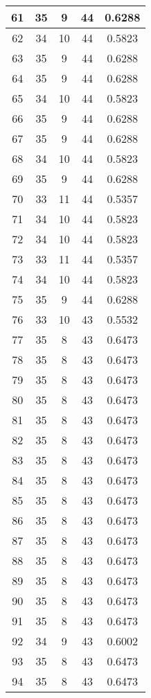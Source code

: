 \documentclass[letterpaper, 12pt]{article}
\begin{document}
\begin{longtable}{|c|c|c|c|c|}
\hline
61 & 35 & 9 & 44 & 0.6288 \\
\hline
62 & 34 & 10 & 44 & 0.5823 \\
\hline
63 & 35 & 9 & 44 & 0.6288 \\
\hline
64 & 35 & 9 & 44 & 0.6288 \\
\hline
65 & 34 & 10 & 44 & 0.5823 \\
\hline
66 & 35 & 9 & 44 & 0.6288 \\
\hline
67 & 35 & 9 & 44 & 0.6288 \\
\hline
68 & 34 & 10 & 44 & 0.5823 \\
\hline
69 & 35 & 9 & 44 & 0.6288 \\
\hline
70 & 33 & 11 & 44 & 0.5357 \\
\hline
71 & 34 & 10 & 44 & 0.5823 \\
\hline
72 & 34 & 10 & 44 & 0.5823 \\
\hline
73 & 33 & 11 & 44 & 0.5357 \\
\hline
74 & 34 & 10 & 44 & 0.5823 \\
\hline
75 & 35 & 9 & 44 & 0.6288 \\
\hline
76 & 33 & 10 & 43 & 0.5532 \\
\hline
77 & 35 & 8 & 43 & 0.6473 \\
\hline
78 & 35 & 8 & 43 & 0.6473 \\
\hline
79 & 35 & 8 & 43 & 0.6473 \\
\hline
80 & 35 & 8 & 43 & 0.6473 \\
\hline
81 & 35 & 8 & 43 & 0.6473 \\
\hline
82 & 35 & 8 & 43 & 0.6473 \\
\hline
83 & 35 & 8 & 43 & 0.6473 \\
\hline
84 & 35 & 8 & 43 & 0.6473 \\
\hline
85 & 35 & 8 & 43 & 0.6473 \\
\hline
86 & 35 & 8 & 43 & 0.6473 \\
\hline
87 & 35 & 8 & 43 & 0.6473 \\
\hline
88 & 35 & 8 & 43 & 0.6473 \\
\hline
89 & 35 & 8 & 43 & 0.6473 \\
\hline
90 & 35 & 8 & 43 & 0.6473 \\
\hline
91 & 35 & 8 & 43 & 0.6473 \\
\hline
92 & 34 & 9 & 43 & 0.6002 \\
\hline
93 & 35 & 8 & 43 & 0.6473 \\
\hline
94 & 35 & 8 & 43 & 0.6473 \\
\hline

\end{longtable}
\end{document}
